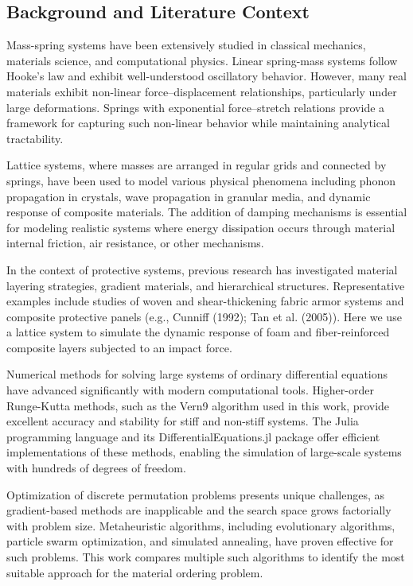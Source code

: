 \documentclass[11pt,a4paper]{article}
\begin{document}
\subsection{Background and Literature Context}

Mass-spring systems have been extensively studied in classical mechanics, materials science, and computational physics. Linear spring-mass systems follow Hooke's law and exhibit well-understood oscillatory behavior. However, many real materials exhibit non-linear force--displacement relationships, particularly under large deformations. Springs with exponential force--stretch relations provide a framework for capturing such non-linear behavior while maintaining analytical tractability. \newline

\noindent Lattice systems, where masses are arranged in regular grids and connected by springs, have been used to model various physical phenomena including phonon propagation in crystals, wave propagation in granular media, and dynamic response of composite materials. The addition of damping mechanisms is essential for modeling realistic systems where energy dissipation occurs through material internal friction, air resistance, or other mechanisms. \newline

\noindent In the context of protective systems, previous research has investigated material layering strategies, gradient materials, and hierarchical structures. Representative examples include studies of woven and shear-thickening fabric armor systems and composite protective panels (e.g., Cunniff (1992); Tan et al. (2005)). Here we use a lattice system to simulate the dynamic response of foam and fiber-reinforced composite layers subjected to an impact force. \newline

\noindent Numerical methods for solving large systems of ordinary differential equations have advanced significantly with modern computational tools. Higher-order Runge-Kutta methods, such as the Vern9 algorithm used in this work, provide excellent accuracy and stability for stiff and non-stiff systems. The Julia programming language and its DifferentialEquations.jl package offer efficient implementations of these methods, enabling the simulation of large-scale systems with hundreds of degrees of freedom. \newline

\noindent Optimization of discrete permutation problems presents unique challenges, as gradient-based methods are inapplicable and the search space grows factorially with problem size. Metaheuristic algorithms, including evolutionary algorithms, particle swarm optimization, and simulated annealing, have proven effective for such problems. This work compares multiple such algorithms to identify the most suitable approach for the material ordering problem.
\end{document}
